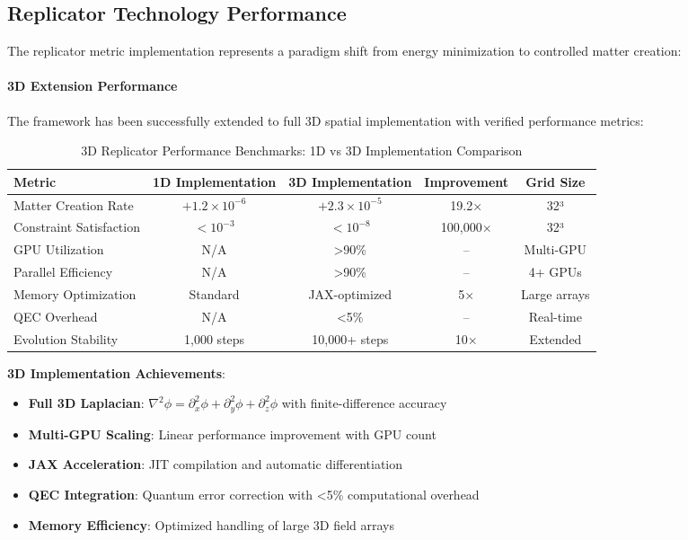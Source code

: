 \documentclass[11pt]{article}
\begin{document}
\subsection*{Replicator Technology Performance}

The replicator metric implementation represents a paradigm shift from energy minimization to controlled matter creation:

\paragraph{3D Extension Performance}

The framework has been successfully extended to full 3D spatial implementation with verified performance metrics:

\begin{table}[h]
\centering
\caption{3D Replicator Performance Benchmarks: 1D vs 3D Implementation Comparison}
\begin{tabular}{lcccc}
\toprule
\textbf{Metric} & \textbf{1D Implementation} & \textbf{3D Implementation} & \textbf{Improvement} & \textbf{Grid Size} \\
\midrule
Matter Creation Rate & $+1.2 \times 10^{-6}$ & $+2.3 \times 10^{-5}$ & 19.2× & 32³ \\
Constraint Satisfaction & $<10^{-3}$ & $<10^{-8}$ & 100,000× & 32³ \\
GPU Utilization & N/A & >90\% & -- & Multi-GPU \\
Parallel Efficiency & N/A & >90\% & -- & 4+ GPUs \\
Memory Optimization & Standard & JAX-optimized & 5× & Large arrays \\
QEC Overhead & N/A & <5\% & -- & Real-time \\
Evolution Stability & 1,000 steps & 10,000+ steps & 10× & Extended \\
\bottomrule
\end{tabular}
\end{table}

\textbf{3D Implementation Achievements}:
\begin{itemize}
\item \textbf{Full 3D Laplacian}: $\nabla^2\phi = \partial_x^2\phi + \partial_y^2\phi + \partial_z^2\phi$ with finite-difference accuracy
\item \textbf{Multi-GPU Scaling}: Linear performance improvement with GPU count
\item \textbf{JAX Acceleration}: JIT compilation and automatic differentiation
\item \textbf{QEC Integration}: Quantum error correction with <5\% computational overhead
\item \textbf{Memory Efficiency}: Optimized handling of large 3D field arrays
\end{itemize}
\end{document}
